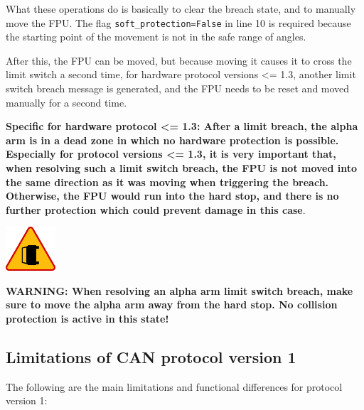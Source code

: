 \documentclass[11pt,a4paper]{report}
\newenvironment{warning}{\begin{framed}\includegraphics[width=5em]{accident-area-ahead.png}
}{\end{framed}}
\begin{document}
What these operations do is basically to clear the breach state, and
to manually move the FPU.  The flag \texttt{soft\_protection=False} in
line 10 is required because the starting point of the movement
is not in the safe range of angles.

After this, the FPU can be moved, but because moving it causes it to
cross the limit switch a second time, for hardware protocol versions
<= 1.3, another limit switch breach message is generated, and the FPU
needs to be reset and moved manually for a second time.

  \textbf{Specific for
  hardware protocol <= 1.3: After a limit breach, the alpha arm is in
  a dead zone in which no hardware protection is possible.  Especially
  for protocol versions <= 1.3, it is very important that, when
  resolving such a limit switch breach, the FPU is not moved into the
  same direction as it was moving when triggering the breach.
  Otherwise, the FPU would run into the hard stop, and there is no
  further protection which could prevent damage in this case}.

\begin{warning}
  \textbf{WARNING: When resolving an alpha arm limit switch breach,
    make sure to move the alpha arm away from the hard stop.  No
    collision protection is active in this state!}
\end{warning}

\subsection{Limitations of CAN protocol version 1}
The following are the main limitations and functional
differences for protocol version 1:
\end{document}
